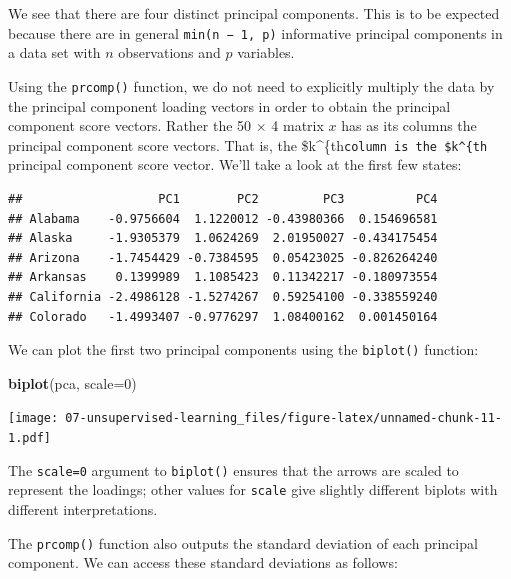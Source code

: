 \documentclass[openany]{book}
\newenvironment{Shaded}{\begin{snugshade}}{\end{snugshade}}
\newcommand{\DataTypeTok}[1]{\textcolor[rgb]{0.13,0.29,0.53}{#1}}
\newcommand{\DecValTok}[1]{\textcolor[rgb]{0.00,0.00,0.81}{#1}}
\newcommand{\KeywordTok}[1]{\textcolor[rgb]{0.13,0.29,0.53}{\textbf{#1}}}
\newcommand{\NormalTok}[1]{#1}
\newcommand{\OperatorTok}[1]{\textcolor[rgb]{0.81,0.36,0.00}{\textbf{#1}}}
\begin{document}
We see that there are four distinct principal components. This is to be
expected because there are in general \texttt{min(n\ −\ 1,\ p)} informative principal
components in a data set with \(n\) observations and \(p\) variables.

Using the \texttt{prcomp()} function, we do not need to explicitly multiply the
data by the principal component loading vectors in order to obtain the
principal component score vectors. Rather the 50 × 4 matrix \(x\) has as its
columns the principal component score vectors. That is, the \$k\^{}\{th\texttt{column\ is\ the\ \$k\^{}\{th} principal component score vector. We'll take a look at the first few states:

\begin{Shaded}
\end{Shaded}

\begin{verbatim}
##                   PC1        PC2         PC3          PC4
## Alabama    -0.9756604  1.1220012 -0.43980366  0.154696581
## Alaska     -1.9305379  1.0624269  2.01950027 -0.434175454
## Arizona    -1.7454429 -0.7384595  0.05423025 -0.826264240
## Arkansas    0.1399989  1.1085423  0.11342217 -0.180973554
## California -2.4986128 -1.5274267  0.59254100 -0.338559240
## Colorado   -1.4993407 -0.9776297  1.08400162  0.001450164
\end{verbatim}

We can plot the first two principal components using the \texttt{biplot()} function:

\begin{Shaded}
\begin{Highlighting}[]
\KeywordTok{biplot}\NormalTok{(pca, }\DataTypeTok{scale=}\DecValTok{0}\NormalTok{)}
\end{Highlighting}
\end{Shaded}

\texttt{[image: 07-unsupervised-learning\_files/figure-latex/unnamed-chunk-11-1.pdf]}

The \texttt{scale=0} argument to \texttt{biplot()} ensures that the arrows are scaled to
represent the loadings; other values for \texttt{scale} give slightly different biplots
with different interpretations.

The \texttt{prcomp()} function also outputs the standard deviation of each principal
component. We can access these standard deviations as follows:
\end{document}
